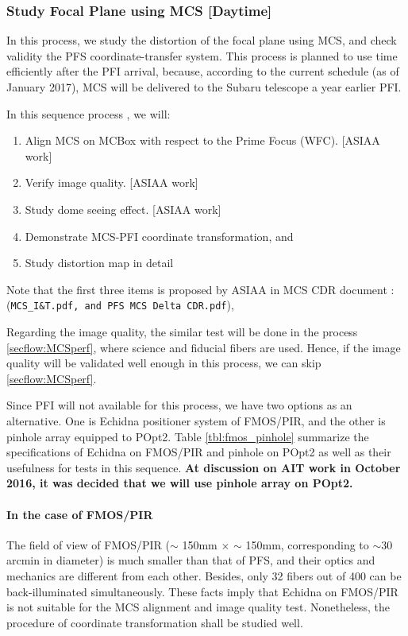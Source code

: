 \subsubsection{Study Focal Plane using MCS [Daytime]}\label{secflow:prestudy}
In this process, we study the distortion of the focal plane using MCS, and check validity the PFS coordinate-transfer system.
This process is planned to use time efficiently after the PFI arrival, because, according to the current schedule (as of January 2017), MCS will be delivered to the Subaru telescope a year earlier PFI.

In this sequence process , we will:
\begin{enumerate}
\item Align MCS on MCBox with respect to the Prime Focus (WFC). [ASIAA work]
\item Verify image quality. [ASIAA work]
\item Study dome seeing effect. [ASIAA work]
\item Demonstrate MCS-PFI coordinate transformation, and
\item Study distortion map in detail
\end{enumerate}
Note that the first three items is proposed by ASIAA in MCS CDR document : ({\tt MCS\_I\&T.pdf, and PFS MCS Delta CDR.pdf}),

Regarding the image quality, the similar test will be done in the process \ref{secflow:MCSperf}, where science and fiducial fibers are used.
Hence, if the image quality will be validated well enough in this process, we can skip \ref{secflow:MCSperf}.

Since PFI will not available for this process, we have two options as an alternative.
One is Echidna positioner system of FMOS/PIR, and the other is pinhole array equipped to POpt2.
Table \ref{tbl:fmos_pinhole} summarize the specifications of Echidna on FMOS/PIR and pinhole on POpt2 as well as their usefulness for tests in this sequence. 
{\bf At discussion on AIT work in October 2016, it was decided that we will use pinhole array on POpt2. }

\paragraph{In the case of FMOS/PIR}
The field of view of FMOS/PIR ($\sim$ 150mm $\times$ $\sim$ 150mm, corresponding to $\sim 30$ arcmin in diameter) is much smaller than that of PFS, and their optics and mechanics are different from each other.
Besides, only 32 fibers out of 400 can be back-illuminated simultaneously.
These facts imply that Echidna on FMOS/PIR is not suitable for the MCS alignment and image quality test.
Nonetheless, the procedure of coordinate transformation shall be studied well.

